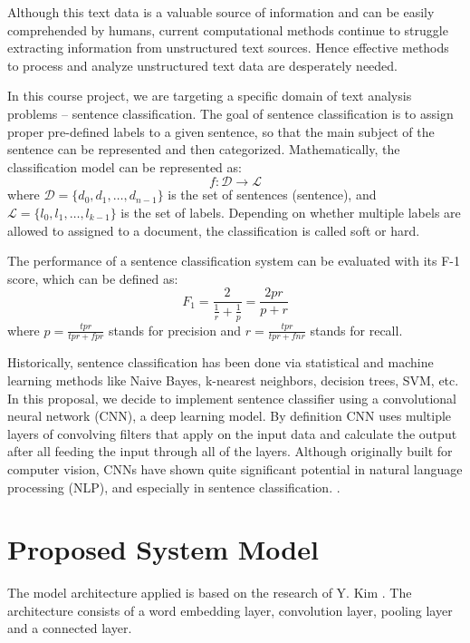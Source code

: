 \documentclass[conference]{IEEEtran}
\begin{document}
    Although this text data is a valuable source of information
    and can be easily comprehended by humans, current computational methods
    continue to struggle extracting information from unstructured text sources\cite{mitchell2015}.
    Hence effective methods to process and analyze unstructured text data are
    desperately needed.
    
    In this course project, we are targeting a specific domain of text analysis
    problems -- sentence classification. The goal of sentence classification is to assign
    proper pre-defined labels to a given sentence, so that the main subject of the 
    sentence can be represented and then categorized\cite{allahyari2017brief}. 
    Mathematically, the classification model can be represented as:
    $$f:\mathcal{D}\rightarrow\mathcal{L}$$
    where $\mathcal{D}=\{d_0, d_1,\ldots, d_{n-1}\}$ is the set of sentences
    (sentence), and $\mathcal{L}=\{l_0, l_1,\ldots, l_{k-1}\}$ is the set of labels.
    Depending on whether multiple labels are allowed to assigned to a document, the 
    classification is called soft or hard\cite{gopal2010multilabel}.
    
    The performance of a sentence classification system can be evaluated with its
    F-1 score, which can be defined as\cite{forman2003extensive}:
    $$F_1=\frac{2}{\frac{1}{r}+\frac{1}{p}}=\frac{2pr}{p+r}$$
    where $p=\frac{tpr}{tpr+fpr}$ stands for precision and $r=\frac{tpr}{tpr+fnr}$ 
    stands for recall.
    
    Historically, sentence classification has been done via statistical 
    and machine learning methods like Naive Bayes, k-nearest neighbors, decision 
    trees, SVM, etc. In this proposal, we decide to implement sentence classifier
    using a convolutional neural network (CNN), a deep learning model. By definition
    CNN uses multiple layers of convolving filters that apply on the input data and 
    calculate the output after all feeding the input through all of the layers. Although
    originally built for computer vision, CNNs have shown quite significant potential in 
    natural language processing (NLP), and especially in sentence classification.
    \cite{kim2014convolutional}. 

\section{Proposed System Model}
The model architecture applied is based on the research of Y. Kim \cite{kim2014convolutional}. The architecture 
consists of a word embedding layer, convolution layer, pooling layer and a connected
layer. 
\end{document}
